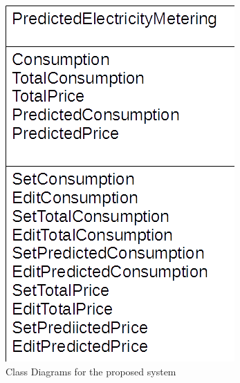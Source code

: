 \begin{figure}[H]
    \includegraphics[width=\textwidth]{./PredictedElectricityMetering.png}
    \caption{Class Diagrams for the proposed system} \label{fig:PredictedElectricityMetering Class Diagram}
\end{figure}

